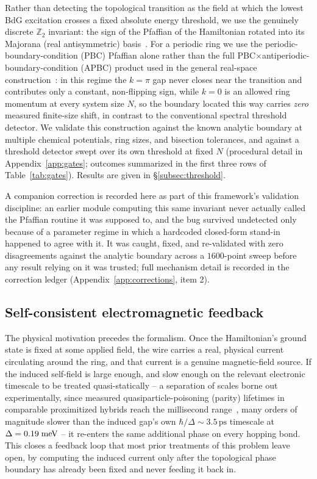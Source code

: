 \documentclass[aps,physrev,reprint,superscriptaddress,amsmath,amssymb,floatfix]{revtex4-2}
\begin{document}
Rather than detecting the topological transition as the field at which
the lowest BdG excitation crosses a fixed absolute energy threshold, we
use the genuinely discrete $\mathbb{Z}_2$ invariant: the sign of the
Pfaffian of the Hamiltonian rotated into its Majorana (real
antisymmetric) basis~\cite{kitaev2001}. For a periodic ring we use the
periodic-boundary-condition (PBC) Pfaffian alone rather than the full
PBC$\times$antiperiodic-boundary-condition (APBC) product used in the
general real-space construction~\cite{pfaffian_realspace2026}: in this regime
the $k=\pi$ gap never closes near the transition and contributes only a
constant, non-flipping sign, while $k=0$ is an allowed ring momentum at
every system size $N$, so the boundary located this way carries
\emph{zero} measured finite-size shift, in contrast to the conventional
spectral threshold detector. We validate this construction against the
known analytic boundary at multiple chemical potentials, ring sizes, and
bisection tolerances, and against a threshold detector swept over its own
threshold at fixed $N$ (procedural detail in Appendix~\ref{app:gates};
outcomes summarized in the first three rows of Table~\ref{tab:gates}).
Results are given in \S\ref{subsec:threshold}.

A companion correction is recorded here as part of this framework's
validation discipline: an earlier module computing this same invariant
never actually called the Pfaffian routine it was supposed to, and the
bug survived undetected only because of a parameter regime in which a
hardcoded closed-form stand-in happened to agree with it. It was caught,
fixed, and re-validated with zero disagreements against the analytic
boundary across a $1600$-point sweep before any result relying on it was
trusted; full mechanism detail is recorded in the correction ledger
(Appendix~\ref{app:corrections}, item 2).

\subsection{Self-consistent electromagnetic feedback}

The physical motivation precedes the formalism. Once the Hamiltonian's
ground state is fixed at some applied field,
the wire carries a real, physical current circulating around the ring,
and that current is a genuine magnetic-field source. If the induced
self-field is large enough, and slow enough on the relevant electronic
timescale to be treated quasi-statically -- a separation of scales borne
out experimentally, since measured quasiparticle-poisoning (parity)
lifetimes in comparable proximitized hybrids reach the millisecond
range~\cite{higginbotham2015parity}, many orders of magnitude slower than
the induced gap's own $\hbar/\Delta\sim3.5\,\mathrm{ps}$ timescale at
$\Delta=0.19\;{\rm meV}$ -- it re-enters the same
additional phase on every hopping bond. This closes a feedback loop that
most prior treatments of this problem leave open, by computing the
induced current only after the topological phase boundary has already
been fixed and never feeding it back in.
\end{document}
